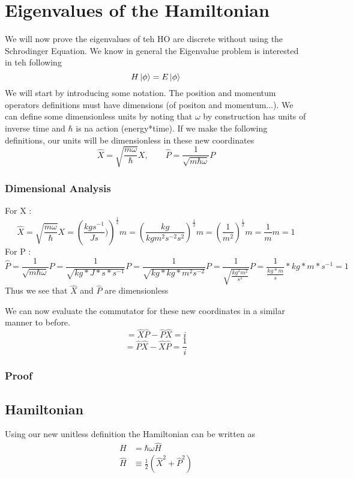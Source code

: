 \documentclass{article}
\newcommand{\be}{\begin{equation}}
\newcommand{\ee}{\end{equation}}
\begin{document}
\section*{Eigenvalues of the Hamiltonian}
We will now prove the eigenvalues of teh HO are discrete without using the Schrodinger Equation. 
We know in general the Eigenvalue problem is interested in teh following 
\be
H\ket{\phi} = E\ket{\phi}
\ee
We will start by introducing some notation. 
The position and momentum operators definitions must have dimensions (of positon and momentum...).
We can define some dimensionless units by noting that $\omega$ by construction has units of inverse time and $\hbar$ is na action (energy*time).
If we make the following definitions, our units will be dimensionless in these new coordinates
\be
\hat{X} = \sqrt{\frac{m\omega}{\hbar}}X, \qquad \hat{P} = \frac{1}{\sqrt{m\hbar \omega}} P
\ee

\subsubsection*{Dimensional Analysis}
For X :
\be
\hat{X}=\sqrt{\frac{m\omega}{\hbar}}X=\left(\frac{kgs^{-1}}{Js})\right)^{\frac{1}{2}}m = \left(\frac{kg}{kgm^{2}s^{-2}s^{2}}\right)^{\frac{1}{2}}m = \left(\frac{1}{m^2}\right)^{\frac{1}{2}} m = \frac{1}{m}m = 1
\ee
For P :
\be
\hat{P} = \frac{1}{\sqrt{m\hbar \omega}} P = \frac{1}{\sqrt{kg *J*s*s^{-1}}} P = \frac{1}{\sqrt{kg*kg*m^2s^{-2}}} P = \frac{1}{\sqrt{\frac{kg^2m^2}{s^2}}} P = \frac{1}{\frac{kg*m}{s}}*kg*m*s^{-1} = 1
\ee
Thus we see that $\hat{X}$ and $\hat{P}$ are dimensionless

We can now evaluate the commutator for these new coordinates in a similar manner to before. 
\be
[\hat{X},\hat{P}] = \hat{X}\hat{P} - \hat{P}\hat{X} = i
\ee
\be
[\hat{P},\hat{X}] = \hat{P}\hat{X} - \hat{X}\hat{P} = \frac{1}{i}
\ee
\subsubsection*{Proof}

\subsection*{Hamiltonian}
Using our new unitless definition the Hamiltonian can be written as 
\be \label{eq:Hamiltonian}
\begin{split}
    H &= \hbar \omega \hat{H}\\
    \hat{H} &\equiv \frac{1}{2}\left(\hat{X}^2 + \hat{P}^2\right)
\end{split}
\ee
\end{document}
